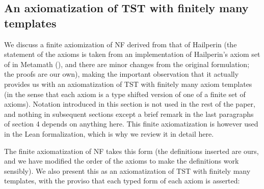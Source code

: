 \documentclass{article}
\theoremstyle{definition}
\theoremstyle{remark}
\begin{document}
\begin{comment}
We think there is merit in giving a brief description of a situation in a more familiar set theory equivalent to (a strengthening of) the very strange situation in a model of tangled type theory.  This section is also useful here because it supports the discussion in the conclusion of one of the unsolved problems which is settled by this paper.

\end{comment}

\newpage

\subsection{An axiomatization of TST with finitely many templates}\label{ss:hailperin}


We discuss a finite axiomization of NF derived from that of Hailperin (the statement of the axioms is taken from an implementation of Hailperin's axiom set of \cite{hailperin} in Metamath (\cite{metamath}), and there are minor changes from the original formulation;  the proofs are our own), making the important observation that it actually provides us with an axiomatization of TST with finitely many
axiom templates (in the sense that each axiom is a type shifted version of one of a finite set of axioms).  Notation introduced in this section is not used in the rest of the paper, and nothing in subsequent sections except a brief remark in the last paragraphs of section 4 depends on anything here.  This finite axiomatization is however used in the Lean formalization, which is why we review it in detail here.

The finite axiomatization of NF takes this form (the definitions inserted are ours, and we have modified the order of the axioms to make the definitions work sensibly).  We also present this as an axiomatization of TST with finitely many templates, with the proviso that each typed form of each axiom is asserted:
\end{document}
